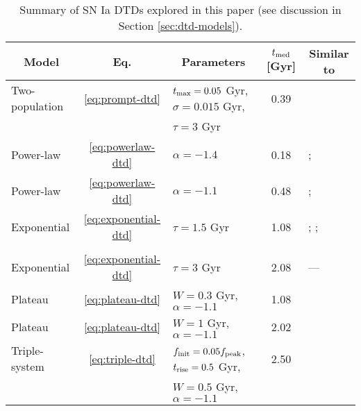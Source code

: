 \documentclass[twocolumn,twocolappendix,linenumbers]{aastex631}
\begin{document}
\begin{table*}
    \centering
    \caption{Summary of SN Ia DTDs explored in this paper (see discussion in Section \ref{sec:dtd-models}).}
    \label{tab:dtds}
    \begin{tabular}{lclcl}
        \hline\hline
        \multicolumn{1}{c}{Model} & Eq. & \multicolumn{1}{c}{Parameters} & $t_{\rm med}$ [Gyr] & \multicolumn{1}{c}{Similar to} \\
        \hline
        Two-population  & \ref{eq:prompt-dtd}   & $t_{\rm max}=0.05$ Gyr, $\sigma=0.015$ Gyr,   & 0.39  & \citet{Mannucci2006-TwoPopulations} \\
                        &                       & $\tau=3$ Gyr & & \\
        Power-law   & \ref{eq:powerlaw-dtd} & $\alpha=-1.4$                 & 0.18  & \citet[][cluster]{Maoz2017-CosmicDTD}; 
                                                      \citet{Heringer2019-FieldGalaxyDTD}       \\
        Power-law   & \ref{eq:powerlaw-dtd} & $\alpha=-1.1$                 & 0.48  & \citet[][field]{Maoz2017-CosmicDTD}; 
                                                      \citet{Wiseman2021-DESRates}              \\
        Exponential & \ref{eq:exponential-dtd}  & $\tau=1.5$ Gyr    & 1.08  & \citet[][SD]{Greggio2005-AnalyticalRates};
                                                                      \citet{Schonrich2009-RadialMixing};       \\
                    &                           &                   &       & \citet{Weinberg2017-ChemicalEquilibrium}  \\
        Exponential & \ref{eq:exponential-dtd}  & $\tau=3$ Gyr   & 2.08 & --- \\
        Plateau     & \ref{eq:plateau-dtd}  & $W=0.3$ Gyr, $\alpha=-1.1$    & 1.08  &\citet[][CLOSE DD]{Greggio2005-AnalyticalRates} \\
        Plateau     & \ref{eq:plateau-dtd}  & $W=1$ Gyr, $\alpha=-1.1$      & 2.02  & \citet[][WIDE DD]{Greggio2005-AnalyticalRates} \\
        Triple-system   & \ref{eq:triple-dtd}   & $f_{\rm init}=0.05f_{\rm peak}$, $t_{\rm rise}=0.5$ Gyr, & 2.50   & \citet{Rajamuthukumar2023-TripleEvolution} \\
                        &                       & $W=0.5$ Gyr, $\alpha=-1.1$ & &  \\
        \hline
    \end{tabular}
\end{table*}
\end{document}
